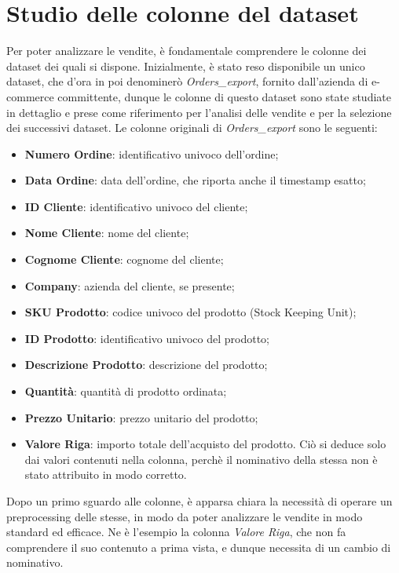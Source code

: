 \section{Studio delle colonne del dataset}
\label{sec:studio-colonne-dataset}
Per poter analizzare le vendite, è fondamentale comprendere le colonne dei dataset dei quali si dispone. Inizialmente, è stato reso disponibile un unico dataset, che d'ora in poi denominerò \emph{Orders\_export}, fornito dall'azienda di e-commerce committente, dunque le colonne di questo dataset sono state studiate in dettaglio e prese come riferimento per l'analisi delle vendite e per la selezione dei successivi dataset. Le colonne originali di \emph{Orders\_export} sono le seguenti:
\begin{itemize}
    \item \textbf{Numero Ordine}: identificativo univoco dell'ordine;
    \item \textbf{Data Ordine}: data dell'ordine, che riporta anche il timestamp esatto;
    \item \textbf{ID Cliente}: identificativo univoco del cliente;
    \item \textbf{Nome Cliente}: nome del cliente;
    \item \textbf{Cognome Cliente}: cognome del cliente;
    \item \textbf{Company}: azienda del cliente, se presente;
    \item \textbf{SKU Prodotto}: codice univoco del prodotto (Stock Keeping Unit);
    \item \textbf{ID Prodotto}: identificativo univoco del prodotto;
    \item \textbf{Descrizione Prodotto}: descrizione del prodotto;
    \item \textbf{Quantità}: quantità di prodotto ordinata;
    \item \textbf{Prezzo Unitario}: prezzo unitario del prodotto;
    \item \textbf{Valore Riga}: importo totale dell'acquisto del prodotto. Ciò si deduce solo dai valori contenuti nella colonna, perchè il nominativo della stessa non è stato attribuito in modo corretto.
\end{itemize}

Dopo un primo sguardo alle colonne, è apparsa chiara la necessità di operare un \gls{preprocessing}\glsfirstoccur{} delle stesse, in modo da poter analizzare le vendite in modo standard ed efficace. Ne è l'esempio la colonna \emph{Valore Riga}, che non fa comprendere il suo contenuto a prima vista, e dunque necessita di un cambio di nominativo.

